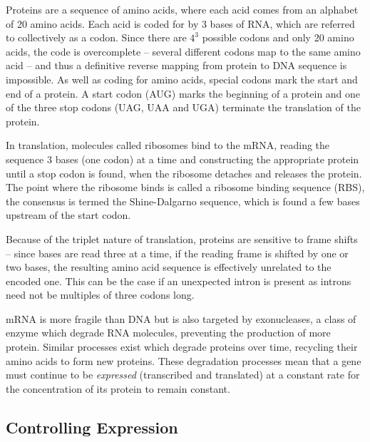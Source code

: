 Proteins are a sequence of amino acids, where each acid comes from an alphabet
of 20 amino acids.
Each acid is coded for by 3 bases of RNA, which are referred to collectively 
as a codon.
Since there are $4^3$ possible codons and only 20 amino acids, the code is
overcomplete -- several different codons map to the same amino acid -- and
thus a definitive reverse mapping from protein to DNA sequence is impossible.
As well as coding for amino acids, special codons mark the start and end of a
protein.
A start codon (AUG) marks the beginning of a protein and one of the three stop 
codons (UAG, UAA and UGA) terminate the translation of the protein.

In translation, molecules called ribosomes bind to the mRNA, reading the
sequence 3 bases (one codon) at a time and constructing the appropriate protein
until a stop codon is found, when the ribosome detaches and releases the
protein.
The point where the ribosome binds is called a ribosome binding sequence (RBS),
the consensus is termed the Shine-Dalgarno sequence, which is found a few 
bases upstream of the start codon.

Because of the triplet nature of translation, proteins are sensitive to frame
shifts -- since bases are read three at a time, if the reading frame is shifted 
by one or two bases, the resulting amino acid sequence is effectively unrelated 
to the encoded one.
This can be the case if an unexpected intron is present as introns need not be 
multiples of three codons long.

mRNA is more fragile than DNA but is also targeted by exonucleases, a class of
enzyme which degrade RNA molecules, preventing the production of more protein.
Similar processes exist which degrade proteins over time, recycling their amino
acids to form new proteins.
These degradation processes mean that a gene must continue to be 
\emph{expressed} (transcribed and translated) at a constant rate for the 
concentration of its protein to remain constant.

\subsection{Controlling Expression}
\label{sec:mbio_control}


